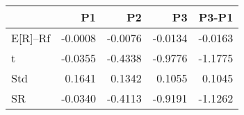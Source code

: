 \begin{tabular}{lrrrr}
\toprule
 & P1 & P2 & P3 & P3-P1 \\
\midrule
E[R]--Rf & -0.0008 & -0.0076 & -0.0134 & -0.0163 \\
t & -0.0355 & -0.4338 & -0.9776 & -1.1775 \\
Std & 0.1641 & 0.1342 & 0.1055 & 0.1045 \\
SR & -0.0340 & -0.4113 & -0.9191 & -1.1262 \\
\bottomrule
\end{tabular}

